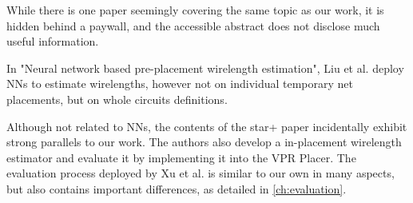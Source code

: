 While there is one paper seemingly covering the same topic as our work, it is hidden behind a paywall, and the accessible abstract does not disclose much useful information.\cite{doi:10.1142/S0218213098000202}

In "Neural network based pre-placement wirelength estimation"\cite{pre-placement-estimation}, Liu et al. deploy \glspl{NN} to estimate wirelengths, however not on individual temporary net placements, but on whole circuits definitions.

Although not related to \glspl{NN}, the contents of the star+ paper incidentally exhibit strong parallels to our work. The authors also develop a in-placement wirelength estimator and evaluate it by implementing it into the \gls{VPR} Placer. The evaluation process deployed by Xu et al. is similar to our own in many aspects, but also contains important differences, as detailed in \ref{ch:evaluation}.
